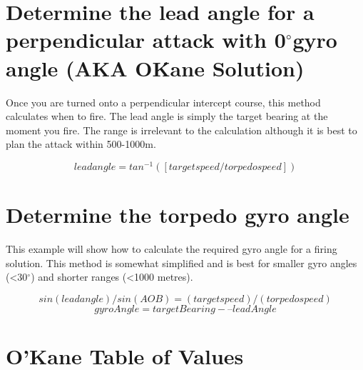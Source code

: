 \documentclass{article}
\newcommand{\degree}{$^{\circ}$}
\begin{document}


\section{Determine the lead angle for a perpendicular attack with 0\degree gyro angle (AKA O\'Kane Solution)}

Once you are turned onto a perpendicular intercept course, this method calculates when to fire. The lead angle is simply the target bearing at the moment you fire. The range is irrelevant to the calculation although it is best to plan the attack within 500-1000m.

$$ lead angle = tan^{-1} ( [target speed / torpedo speed] ) $$

\section{Determine the torpedo gyro angle}
This example will show how to calculate the required gyro angle for a firing solution. This method is somewhat simplified and is best for smaller gyro angles (\textless 30\degree) and shorter ranges (\textless 1000 metres).

$$sin (lead angle) / sin (AOB) = (target speed) / (torpedo speed)$$
$$ gyroAngle = targetBearing -– leadAngle $$

\section{O'Kane Table of Values}
\end{document}
